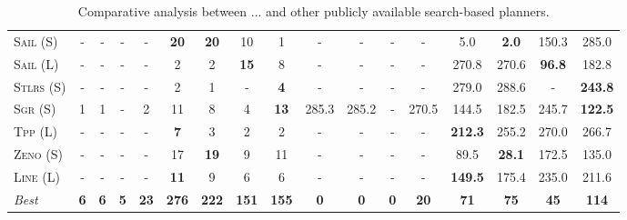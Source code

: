 \documentclass[11pt]{article}
\begin{document}
\begin{table}[tb]
{\begin{tabular}{|l||cccccccc||cccccccc||}
\textsc{Sail} (S)&-&-&-&-&\textbf{20}&\textbf{20}&10&1&-&-&-&-&5.0&\textbf{2.0}&150.3&285.0\\
\textsc{Sail} (L)&-&-&-&-&2&2&\textbf{15}&8&-&-&-&-&270.8&270.6&\textbf{96.8}&182.8\\
\textsc{Stlrs} (S)&-&-&-&-&2&1&-&\textbf{4}&-&-&-&-&279.0&288.6&-&\textbf{243.8}\\
\textsc{Sgr} (S)&1&1&-&2&11&8&4&\textbf{13}&285.3&285.2&-&270.5&144.5&182.5&245.7&\textbf{122.5}\\
\textsc{Tpp} (L)&-&-&-&-&\textbf{7}&3&2&2&-&-&-&-&\textbf{212.3}&255.2&270.0&266.7\\
\textsc{Zeno} (S)&-&-&-&-&17&\textbf{19}&9&11&-&-&-&-&89.5&\textbf{28.1}&172.5&135.0\\
\textsc{Line} (L)&-&-&-&-&\textbf{11}&9&6&6&-&-&-&-&\textbf{149.5}&175.4&235.0&211.6
\\\hline
\textit{Best}&\textbf{6}&\textbf{6}&\textbf{5}&\textbf{23}&\textbf{276}&\textbf{222}&\textbf{151}&\textbf{155}&\textbf{0}&\textbf{0}&\textbf{0}&\textbf{20}&\textbf{71}&\textbf{75}&\textbf{45}&\textbf{114}\\\hline

        \end{tabular}}
        \caption{Comparative analysis between ... and other publicly available search-based planners.}
        \label{tab:search}
        \end{table}
        
\end{document}
